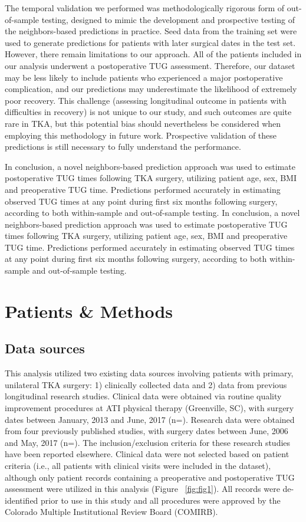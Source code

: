 \documentclass[fleqn,10pt]{wlscirep}\usepackage{knitr}
\begin{document}
The temporal validation we performed was methodologically rigorous form of out-of-sample testing, designed to mimic the development and prospective testing of the neighbors-based predictions in practice.  Seed data from the training set were used to generate predictions for patients with later surgical dates in the test set. However, there remain limitations to our approach. All of the patients included in our analysis underwent a postoperative TUG assessment.  Therefore, our dataset may be less likely to include patients who experienced a major postoperative complication, and our predictions may underestimate the likelihood of extremely poor recovery. This challenge (assessing longitudinal outcome in patients with difficulties in recovery) is not unique to our study, and such outcomes are quite rare in TKA, but this potential bias should nevertheless be considered when employing this methodology in future work.  Prospective validation of these predictions is still necessary to fully understand the performance.

In conclusion, a novel neighbors-based prediction approach was used to estimate postoperative TUG times following TKA surgery, utilizing patient age, sex, BMI and preoperative TUG time. Predictions performed accurately in estimating observed TUG times at any point during first six months following surgery, according to both within-sample and out-of-sample testing. In conclusion, a novel neighbors-based prediction approach was used to estimate postoperative TUG times following TKA surgery, utilizing patient age, sex, BMI and preoperative TUG time. Predictions performed accurately in estimating observed TUG times at any point during first six months following surgery, according to both within-sample and out-of-sample testing. 

\section*{Patients \& Methods}

\subsection*{Data sources}

This analysis utilized two existing data sources involving patients with primary, unilateral TKA surgery: 1) clinically collected data and 2) data from previous longitudinal research studies. Clinical data were obtained via routine quality improvement procedures at ATI physical therapy (Greenville, SC), with surgery dates between January, 2013 and June, 2017 (n=). Research data were obtained from four previously published studies, with surgery dates between June, 2006 and May, 2017 (n=).  The inclusion/exclusion criteria for these research studies have been reported elsewhere. Clinical data were not selected based on patient criteria (i.e., all patients with clinical visits were included in the dataset), although only patient records containing a preoperative and postoperative TUG assessment were utilized in this analysis (Figure ~\ref{fig:fig1}). All records were de-identified prior to use in this study and all procedures were approved by the Colorado Multiple Institutional Review Board (COMIRB).
\end{document}
